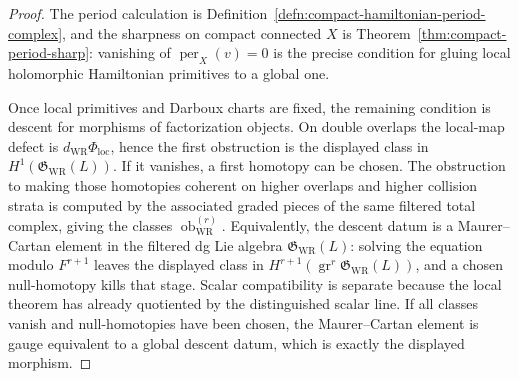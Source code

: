 \begin{proof}
  The period calculation is
  Definition~\ref{defn:compact-hamiltonian-period-complex}, and the
  sharpness on compact connected \(X\) is
  Theorem~\ref{thm:compact-period-sharp}: vanishing of
  \(\operatorname{per}_X(v)=0\) is the precise condition for gluing
  local holomorphic Hamiltonian primitives to a global one.

  Once local primitives and Darboux charts are fixed, the remaining condition is
  descent for morphisms of factorization objects.  On
  double overlaps the local-map defect is
  \(d_{\mathrm{WR}}\Phi_{\mathrm{loc}}\), hence the first obstruction is
  the displayed class in \(H^1(\mathfrak G_{\mathrm{WR}}(L))\).  If it
  vanishes, a first homotopy can be chosen.  The obstruction to making
  those homotopies coherent on higher overlaps and higher collision
  strata is computed by the associated graded pieces of the same filtered
  total complex, giving the classes
  \(\operatorname{ob}^{(r)}_{\mathrm{WR}}\).  Equivalently, the descent
  datum is a Maurer--Cartan element in the filtered dg Lie algebra
  \(\mathfrak G_{\mathrm{WR}}(L)\): solving the equation modulo
  \(F^{r+1}\) leaves the displayed class in
  \(H^{r+1}(\operatorname{gr}^r\mathfrak G_{\mathrm{WR}}(L))\), and a
  chosen null-homotopy kills that stage.  Scalar compatibility is
  separate because the
  local theorem has already quotiented by the distinguished scalar line.
  If all classes vanish and null-homotopies have been chosen, the
  Maurer--Cartan element is gauge equivalent to a global descent datum,
  which is exactly the displayed morphism.
\end{proof}

